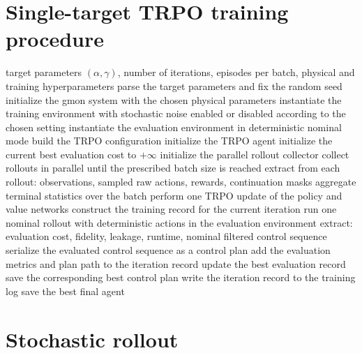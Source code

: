 \section{Single-target TRPO training procedure}
\label{app:trpo_single_target_detailed}
\begin{algorithm}[H]
\caption{Detailed single-target TRPO training procedure}
\label{alg:trpo_single_target_appendix}
\begin{algorithmic}[1]
\Require target parameters $(\alpha,\gamma)$, number of iterations, episodes per batch, physical and training hyperparameters
\State parse the target parameters and fix the random seed
\State initialize the gmon system with the chosen physical parameters
\State instantiate the training environment with stochastic noise enabled or disabled according to the chosen setting
\State instantiate the evaluation environment in deterministic nominal mode
\State build the TRPO configuration
\State initialize the TRPO agent
\State initialize the current best evaluation cost to $+\infty$
\State initialize the parallel rollout collector
        \State collect rollouts in parallel until the prescribed batch size is reached
    \EndIf
    \State extract from each rollout: observations, sampled raw actions, rewards, continuation masks
    \State aggregate terminal statistics over the batch
    \State perform one TRPO update of the policy and value networks
    \State construct the training record for the current iteration
        \State run one nominal rollout with deterministic actions in the evaluation environment
        \State extract: evaluation cost, fidelity, leakage, runtime, nominal filtered control sequence
        \State serialize the evaluated control sequence as a control plan
        \State add the evaluation metrics and plan path to the iteration record
            \State update the best evaluation record
            \State save the corresponding best control plan
        \EndIf
    \EndIf
    \State write the iteration record to the training log
\EndFor
\State save the best final agent
\end{algorithmic}
\end{algorithm}


\section{Stochastic rollout}
\label{app:stochastic_rollout}


